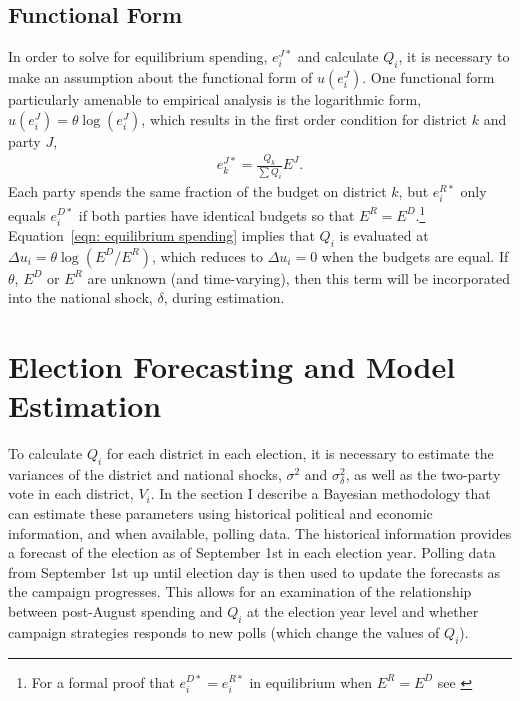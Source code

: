 \documentclass[12pt,final,fleqn]{article}
\theoremstyle{plain}
\begin{document}
\subsection{Functional Form} \label{sec: functional form}
In order to solve for equilibrium spending, $e_i^{J*}$ and calculate $Q_i$, it is necessary to make an assumption about the functional form of $u(e_i^J)$. One functional form particularly amenable to empirical analysis is the logarithmic form, $u(e_i^J)= \theta \log (e_i^J)$, which results in the first order condition for district $k$ and party $J$,
\begin{align} \label{eqn: equilibrium spending}
e_k^{J*} = \frac{Q_k}{\sum Q_i}E^{J}.
\end{align} 
Each party spends the same fraction of the budget on district $k$, but $e_i^{R*}$ only equals $e_i^{D*}$ if both parties have identical budgets so that $E^{R} = E^{D}$.\footnote{For a formal proof that $e_i^{D*} = e_i^{R*}$ in equilibrium when $E^R = E^D$ see \citet{stromberg2008electoral}} Equation~\ref{eqn: equilibrium spending} implies that $Q_i$ is evaluated at $\Delta u_i = \theta \log(E^D/E^R)$, which reduces to $\Delta u_i=0$ when the budgets are equal. If $\theta$, $E^D$ or $E^R$ are unknown (and time-varying), then this term will be incorporated into the national shock, $\delta$, during estimation.

\section{Election Forecasting and Model Estimation}
To calculate $Q_i$ for each district in each election, it is necessary to estimate the variances of the district and national shocks, $\sigma^2$ and $\sigma^2_\delta$, as well as the two-party vote in each district, $V_i$. In the section I describe a Bayesian methodology that can estimate these parameters using historical political and economic information, and when available, polling data. The historical information provides a forecast of the election as of September 1st in each election year. Polling data from September 1st up until election day is then used to update the forecasts as the campaign progresses. This allows for an examination of the relationship between post-August spending and $Q_i$ at the election year level and whether campaign strategies responds to new polls (which change the values of $Q_i$).
\end{document}
